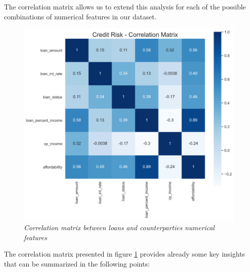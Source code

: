 \documentclass[a4paper,12pt]{article}
\begin{document}
    The correlation matrix allows us to extend this analysis for each 
    of the possible combinations of numerical features in our dataset. 

        \begin{figure}[H]
            \centerline{
                \includegraphics[width=\linewidth]{./images/correlation_matrix.png}
            }
            \caption{\textit{Correlation matrix between loans and counterparties numerical features}}
            \label{fig:corr_matr}
        \end{figure}

    The correlation matrix presented in figure \ref{fig:corr_matr} provides already 
    some key insights that can be summarized in the following points:
\end{document}
